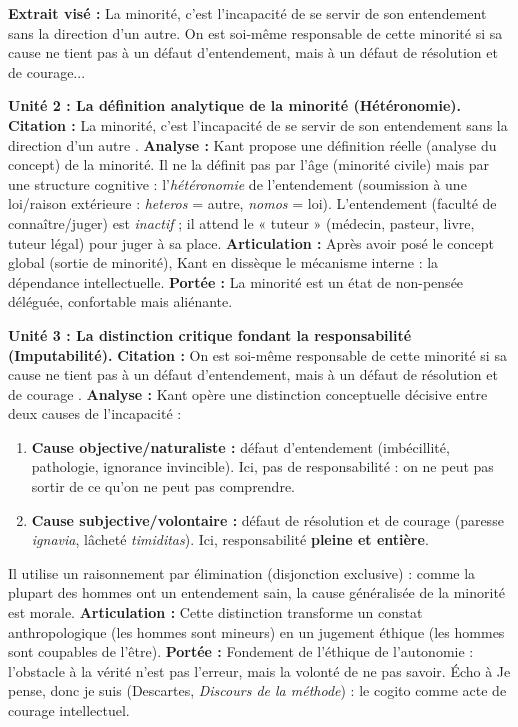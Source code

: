 \documentclass[11pt]{article}
\newcommand{\cle}[1]{{\popxbold\color{popdark}#1}}
\begin{document}
\begin{exoresolu}
\textbf{Extrait visé :} \guillemotleft La minorité, c'est l'incapacité de se servir de son entendement sans la direction d'un autre. On est soi-même responsable de cette minorité si sa cause ne tient pas à un défaut d'entendement, mais à un défaut de résolution et de courage... \guillemotright

\tcblower
\textbf{Unité 2 : La définition analytique de la minorité (Hétéronomie).}
\guillemotleft \textbf{Citation :} \guillemotleft La minorité, c'est l'incapacité de se servir de son entendement sans la direction d'un autre \guillemotright. \guillemotright
\textbf{Analyse :} Kant propose une \cle{définition réelle} (analyse du concept) de la minorité. Il ne la définit pas par l'âge (minorité civile) mais par une \cle{structure cognitive} : l'\emph{hétéronomie} de l'entendement (soumission à une loi/raison extérieure : \emph{heteros} = autre, \emph{nomos} = loi). L'entendement (faculté de connaître/juger) est \emph{inactif} ; il attend le « tuteur » (médecin, pasteur, livre, tuteur légal) pour juger à sa place.
\textbf{Articulation :} Après avoir posé le concept global (sortie de minorité), Kant en dissèque le mécanisme interne : la dépendance intellectuelle.
\textbf{Portée :} La minorité est un état de \cle{non-pensée} déléguée, confortable mais aliénante.

\textbf{Unité 3 : La distinction critique fondant la responsabilité (Imputabilité).}
\guillemotleft \textbf{Citation :} \guillemotleft On est soi-même responsable de cette minorité si sa cause ne tient pas à un défaut d'entendement, mais à un défaut de résolution et de courage \guillemotright. \guillemotright
\textbf{Analyse :} Kant opère une \cle{distinction conceptuelle} décisive entre deux causes de l'incapacité :
\begin{enumerate}
    \item \textbf{Cause objective/naturaliste :} \guillemotleft défaut d'entendement \guillemotright (imbécillité, pathologie, ignorance invincible). Ici, pas de responsabilité : on ne peut pas sortir de ce qu'on ne peut pas comprendre.
    \item \textbf{Cause subjective/volontaire :} \guillemotleft défaut de résolution et de courage \guillemotright (paresse \emph{ignavia}, lâcheté \emph{timiditas}). Ici, responsabilité \textbf{pleine et entière}.
\end{enumerate}
Il utilise un \cle{raisonnement par élimination} (disjonction exclusive) : comme la plupart des hommes ont un entendement sain, la cause généralisée de la minorité est morale.
\textbf{Articulation :} Cette distinction transforme un constat anthropologique (les hommes sont mineurs) en un \cle{jugement éthique} (les hommes sont coupables de l'être).
\textbf{Portée :} Fondement de l'\cle{éthique de l'autonomie} : l'obstacle à la vérité n'est pas l'erreur, mais la volonté de ne pas savoir. Écho à \guillemotleft Je pense, donc je suis \guillemotright (Descartes, \emph{Discours de la méthode}) : le \cle{cogito} comme acte de courage intellectuel.
\end{exoresolu}
\end{document}
